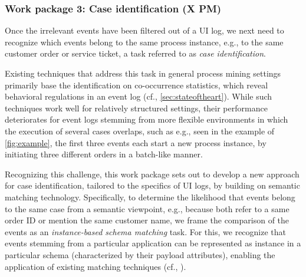 %
% 
% 
%
%

\subsubsection{Work package 3: Case identification (X PM)}
\label{sec:wp3}

Once the irrelevant events have been filtered out of a UI log, we next need to recognize which events belong to the same process instance, e.g., to the same customer order or service ticket, a task referred to as \emph{case identification}.

Existing techniques that address this task in general process mining settings primarily base the identification on co-occurrence statistics, which reveal behavioral regulations in an event log (cf., \autoref{sec:stateoftheart}). While such techniques work well for relatively structured settings, their performance deteriorates for event logs stemming from more flexible environments in which the execution of several cases overlaps, such as e.g., seen in the example of \autoref{fig:example}, the first three events each start a new process instance, by initiating three different orders in a batch-like manner.

Recognizing this challenge, this work package sets out to develop a new approach for case identification, tailored to the specifics of UI logs, by building on semantic matching technology.
Specifically, to determine the likelihood that events belong to the same case from a semantic viewpoint, e.g., because both refer to a same order ID or mention the same customer name, we frame the comparison of the events as an \emph{instance-based schema matching} task. For this, we recognize that events stemming from a particular application can be represented as instance in a particular schema (characterized by their payload attributes), enabling the application of existing matching techniques (cf., \cite{somerefs}).

